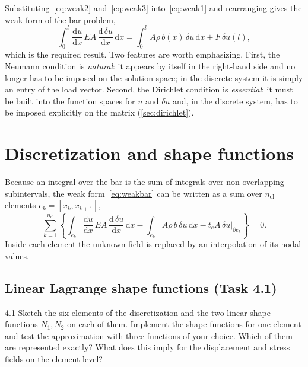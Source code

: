 \documentclass[11pt,a4paper]{article}
\numberwithin{equation}{section}
\theoremstyle{remark}
\begin{document}
Substituting~\eqref{eq:weak2} and~\eqref{eq:weak3} into~\eqref{eq:weak1} and rearranging
gives the weak form of the bar problem,
\begin{equation}\label{eq:weakbar}
  \boxed{\;
  \int_0^l \frac{\mathrm{d}u}{\mathrm{d}x}\,EA\,\frac{\mathrm{d}\,\delta u}{\mathrm{d}x}\,\mathrm{d}x
  = \int_0^l A\rho\,b(x)\,\delta u \,\mathrm{d}x + F\,\delta u(l),
  \;}
\end{equation}
which is the required result. Two features are worth emphasizing. First, the Neumann
condition is \emph{natural}: it appears by itself in the right-hand side and no longer has
to be imposed on the solution space; in the discrete system it is simply an entry of the
load vector. Second, the Dirichlet condition is \emph{essential}: it must be built into
the function spaces for $u$ and $\delta u$ and, in the discrete system, has to be imposed
explicitly on the matrix (\cref{sec:dirichlet}).

\section{Discretization and shape functions}\label{sec:shape}

Because an integral over the bar is the sum of integrals over non-overlapping subintervals,
the weak form~\eqref{eq:weakbar} can be written as a sum over $n_{\mathrm{el}}$ elements
$e_k = [x_k, x_{k+1}]$,
\begin{equation}\label{eq:elementsum}
  \sum_{k=1}^{n_{\mathrm{el}}}\left\{
    \int_{e_k} \frac{\mathrm{d}u}{\mathrm{d}x}\,EA\,\frac{\mathrm{d}\,\delta u}{\mathrm{d}x}\,\mathrm{d}x
    - \int_{e_k} A\rho\,b\,\delta u\,\mathrm{d}x
    - \bar{t}_e A\,\delta u \big|_{\partial e_k}
  \right\} = 0 .
\end{equation}
Inside each element the unknown field is replaced by an interpolation of its nodal values.

\subsection{Linear Lagrange shape functions (Task 4.1)}\label{sec:shapefun}

\begin{task}{4.1}
  Sketch the six elements of the discretization and the two linear shape functions
  $N_1, N_2$ on each of them. Implement the shape functions for one element and test the
  approximation with three functions of your choice. Which of them are represented
  exactly? What does this imply for the displacement and stress fields on the element
  level?
\end{task}
\end{document}
